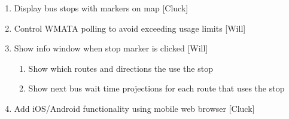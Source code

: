 \documentclass[12pt]{article}
\begin{document}
\begin{description}
\begin{enumerate}
		\item Display bus stops with markers on map [Cluck]
		\item Control WMATA polling to avoid exceeding usage limits [Will]
		\item Show info window when stop marker is clicked [Will]
			\begin{enumerate}
				\item Show which routes and directions the use the stop
				\item Show next bus wait time projections for each route that uses the stop
			\end{enumerate}
		\item Add iOS/Android functionality using mobile web browser [Cluck]
	\end{enumerate}
\end{description}
\end{document}
